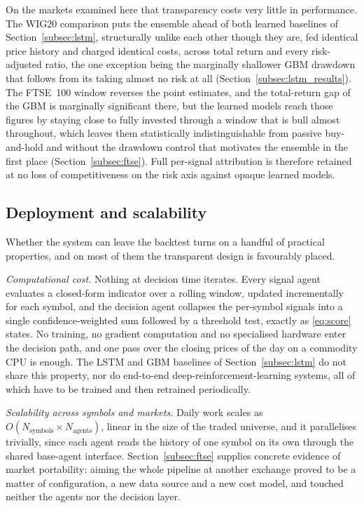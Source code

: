 On the markets examined here that transparency costs very little in performance. The WIG20 comparison puts the ensemble ahead of both learned baselines of Section~\ref{subsec:lstm}, structurally unlike each other though they are, fed identical price history and charged identical costs, across total return and every risk-adjusted ratio, the one exception being the marginally shallower GBM drawdown that follows from its taking almost no risk at all (Section~\ref{subsec:lstm_results}). The FTSE~100 window reverses the point estimates, and the total-return gap of the GBM is marginally significant there, but the learned models reach those figures by staying close to fully invested through a window that is bull almost throughout, which leaves them statistically indistinguishable from passive buy-and-hold and without the drawdown control that motivates the ensemble in the first place (Section~\ref{subsec:ftse}). Full per-signal attribution is therefore retained at no loss of competitiveness on the risk axis against opaque learned models.

\subsection{Deployment and scalability}\label{subsec:deployment}

Whether the system can leave the backtest turns on a handful of practical properties, and on most of them the transparent design is favourably placed.

\emph{Computational cost.} Nothing at decision time iterates. Every signal agent evaluates a closed-form indicator over a rolling window, updated incrementally for each symbol, and the decision agent collapses the per-symbol signals into a single confidence-weighted sum followed by a threshold test, exactly as \eqref{eq:score} states. No training, no gradient computation and no specialised hardware enter the decision path, and one pass over the closing prices of the day on a commodity CPU is enough. The LSTM and GBM baselines of Section~\ref{subsec:lstm} do not share this property, nor do end-to-end deep-reinforcement-learning systems, all of which have to be trained and then retrained periodically.

\emph{Scalability across symbols and markets.} Daily work scales as $O(N_\text{symbols} \times N_\text{agents})$, linear in the size of the traded universe, and it parallelises trivially, since each agent reads the history of one symbol on its own through the shared base-agent interface. Section~\ref{subsec:ftse} supplies concrete evidence of market portability: aiming the whole pipeline at another exchange proved to be a matter of configuration, a new data source and a new cost model, and touched neither the agents nor the decision layer.

